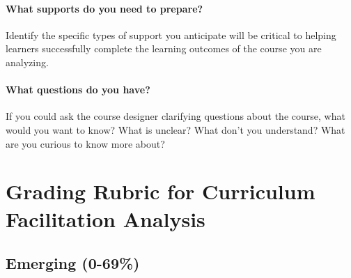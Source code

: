 \documentclass[
]{book}
\begin{document}
\hypertarget{what-supports-do-you-need-to-prepare}{%
\paragraph{What supports do you need to prepare?}\label{what-supports-do-you-need-to-prepare}}

Identify the specific types of support you anticipate will be critical to helping learners successfully complete the learning outcomes of the course you are analyzing.

\hypertarget{what-questions-do-you-have}{%
\paragraph{What questions do you have?}\label{what-questions-do-you-have}}

If you could ask the course designer clarifying questions about the course, what would you want to know? What is unclear? What don't you understand? What are you curious to know more about?

\hypertarget{grading-rubric-for-curriculum-facilitation-analysis}{%
\section{Grading Rubric for Curriculum Facilitation Analysis}\label{grading-rubric-for-curriculum-facilitation-analysis}}

\hypertarget{emerging-0-69}{%
\subsection{Emerging (0-69\%)}\label{emerging-0-69}}
\end{document}
